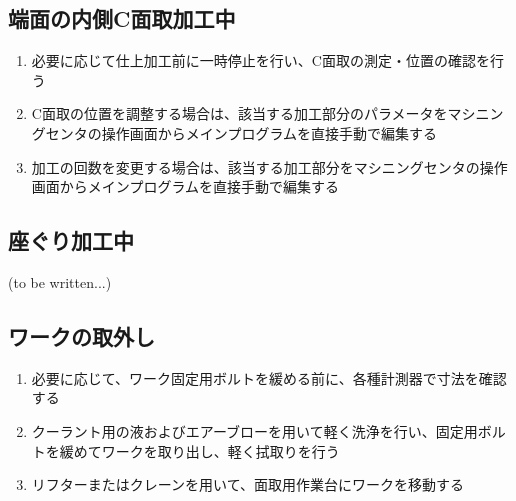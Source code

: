 \subsection{端面の内側C面取加工中}
\begin{enumerate}
\item 必要に応じて仕上加工前に一時停止を行い、C面取の測定・位置の確認を行う
\item C面取の位置を調整する場合は、該当する加工部分のパラメータをマシニングセンタの操作画面からメインプログラムを直接手動で編集する
\item {}加工の回数を変更する場合は、該当する加工部分をマシニングセンタの操作画面からメインプログラムを直接手動で編集する
\end{enumerate}


\subsection{座ぐり加工中\TBW}
(to be written...)



\clearpage


\subsection{ワークの取外し}
\begin{enumerate}
\item 必要に応じて、ワーク固定用ボルトを緩める前に、各種計測器で寸法を確認する
\item クーラント用の液およびエアーブローを用いて軽く洗浄を行い、固定用ボルトを緩めてワークを取り出し、軽く拭取りを行う
\item {}リフターまたはクレーンを用いて、面取用作業台にワークを移動する
\end{enumerate}


